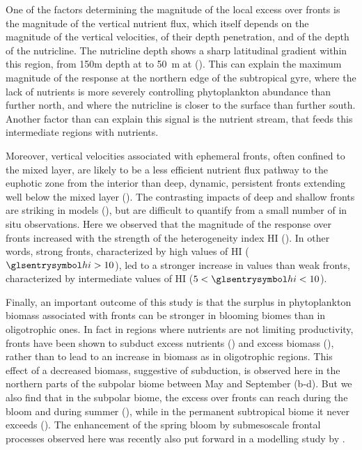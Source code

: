 One of the factors determining the magnitude of the local  excess over fronts is the magnitude of the vertical nutrient flux, which itself depends on the magnitude of the vertical velocities, of their depth penetration, and of the depth of the nutricline.
The nutricline depth shows a sharp latitudinal gradient within this region, from 150m depth at  to \qty{50}{\m} at  (\cite{romera-castillo_2016}).
This can explain the maximum magnitude of the  response at the northern edge of the subtropical gyre, where the lack of nutrients is more severely controlling phytoplankton abundance than further north, and where the nutricline is closer to the surface than further south. Another factor than can explain this signal is the nutrient stream, that feeds this intermediate regions with nutrients.

Moreover, vertical velocities associated with ephemeral fronts, often confined to the mixed layer, are likely to be a less efficient nutrient flux pathway to the euphotic zone from the interior than deep, dynamic, persistent fronts extending well below the mixed layer (\cite{levy_2018}).
The contrasting impacts of deep and shallow fronts are striking in models (\cite{levy_2012}), but are difficult to quantify from a small number of in situ observations.
Here we observed that the magnitude of the  response over fronts increased with the strength of the heterogeneity index HI ().
In other words, strong fronts, characterized by high values of HI (\(\am{hi} > 10\)), led to a stronger increase in  values than weak fronts, characterized by intermediate values of HI (\(5 < \am{hi} < 10\)).

Finally, an important outcome of this study is that the surplus in phytoplankton biomass associated with fronts can be stronger in blooming biomes than in oligotrophic ones.
In fact in regions where nutrients are not limiting productivity, fronts have been shown to subduct excess nutrients (\cite{oschlies_2002, gruber_2011}) and excess biomass (\cite{lathuiliere_2010}), rather than to lead to an increase in biomass as in oligotrophic regions.
This effect of a decreased biomass, suggestive of subduction, is observed here in the northern parts of the subpolar biome between May and September (b-d).
But we also find that in the subpolar biome, the  excess over fronts can reach  during the bloom and  during summer (), while in the permanent subtropical biome it never exceeds  ().
The enhancement of the spring bloom by submesoscale frontal processes observed here was recently also put forward in a modelling study by \textcite{simoes-sousa_2022}.

